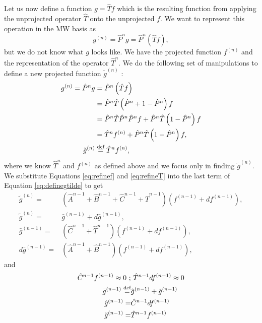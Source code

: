 \documentclass[../master_thesis.tex]{subfiles}
\begin{document}
Let us now define a function $g = \hat{T}f$ which is the resulting function from applying the
unprojected operator $\hat{T}$ onto the unprojected $f$. We want to represent this
operation in the \ac{MW} basis as
\begin{equation}
  g^{(n)} = \hat{P}^ng =  \hat{P}^n\left(\hat{T}f\right),
\end{equation}
but we do not know what $g$ looks like. We have the projected function $f^{ (n)}$ and the
representation of the operator $\hat{T}^n$. We do the following set of manipulations to
define a new projected function $\tilde{g}^{(n)}$ \cite{Frediani:2013}:
\begin{align}
  \begin{split}\label{eq:definegtilde}
    g^{(n)} = \hat{P}^ng &=  \hat{P}^n\left(\hat{T}f\right)\\
     &= \hat{P}^n\hat{T}\left(\hat{P}^n + 1 - \hat{P}^n\right)f\\
     &= \hat{P}^n\hat{T}\hat{P}^n\hat{P}^nf + \hat{P}^n\hat{T}\left(1 - \hat{P}^n\right)f\\
     &=   \hat{T}^nf^{(n)} + \hat{P}^n\hat{T}\left(1 - \hat{P}^n\right)f,\\
    \tilde{g}^{(n)} &\stackrel{\text{def}}{=} \hat{T}^nf^{(n)},\\
  \end{split}
\end{align}
where we know $ \hat{T}^n$ and $f^{(n)}$ as defined above and we focus only in
finding $\tilde{g}^{(n)}$. We substitute Equations \ref{eq:refinef} and \ref{eq:refineT}
into the last term of Equation \ref{eq:definegtilde} to get
\begin{align}
  \tilde{g}^{(n)} =& \left(\hat{A}^{n-1} + \hat{B}^{n-1} + \hat{C}^{n-1} + \hat{T}^{n-1}\right)\left(f^{(n-1)} + df^{(n-1)}\right),\\
  \tilde{g}^{(n)} =&  \bar{g}^{(n-1)} + d\bar{g}^{(n-1)},\\
  \bar{g}^{(n-1)} =&\left(\hat{C}^{n-1} + \hat{T}^{n-1}\right)\left(f^{(n-1)} + df^{(n-1)}\right),\\
  d\bar{g}^{(n-1)} =& \left(\hat{A}^{n-1} + \hat{B}^{n-1}\right)\left(f^{(n-1)} + df^{(n-1)}\right),
\end{align}
and
\begin{align}
  \begin{split}
    \hat{C}^{n-1}f^{(n-1)} \approx 0 \ ;& \ \hat{T}^{n-1}df^{(n-1)}\approx 0\\
    \bar{g}^{(n-1)} \defeq& \hat{g}^{(n-1)} + \tilde{g}^{(n-1)}\\
    \hat{g}^{(n-1)} =& \hat{C}^{n-1}df^{(n-1)}\\
    \tilde{g}^{(n-1)} =& \hat{T}^{n-1}f^{(n-1)}
  \end{split}
\end{align}
\end{document}
